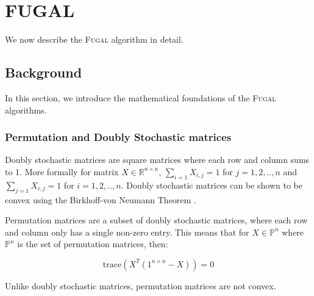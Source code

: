 
\section{\textsc{FUGAL}}

We now describe the \textsc{Fugal} \citep{fugal2024} algorithm in detail.

\subsection{Background}
In this section, we introduce the mathematical foundations of the \textsc{Fugal} algorithms.
\subsubsection{Permutation and Doubly Stochastic matrices}
Doubly stochastic matrices are square matrices where each row and column sums to 1. More formally for matrix $X \in \mathds{R}^{n \times n}$, $\sum_{i = 1} X_{i,j} = 1$ for $j = 1, 2, .., n$ and $\sum_{j = 1} X_{i,j} = 1$ for $i = 1, 2, .., n$. Doubly stochastic matrices can be shown to be convex using the Birkhoff-von Neumann Theorem \citep{birkhoff1946three}.

Permutation matrices are a subset of doubly stochastic matrices, where each row and column only has a single non-zero entry. This means that for $X \in \mathds{P}^n$ where $\mathds{P}^n$ is the set of permutation matrices, then:

\begin{equation}\label{perm_def}
    \text{trace}(X^T(1^{n \times n}-X)) = 0
\end{equation}

Unlike doubly stochastic matrices, permutation matrices are not convex.%

